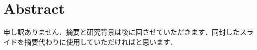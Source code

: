 \chapter*{{\rm \bf Abstract}}
\label{chapter:Abstract}
申し訳ありません．摘要と研究背景は後に回させていただきます．同封したスライドを摘要代わりに使用していただければと思います．
